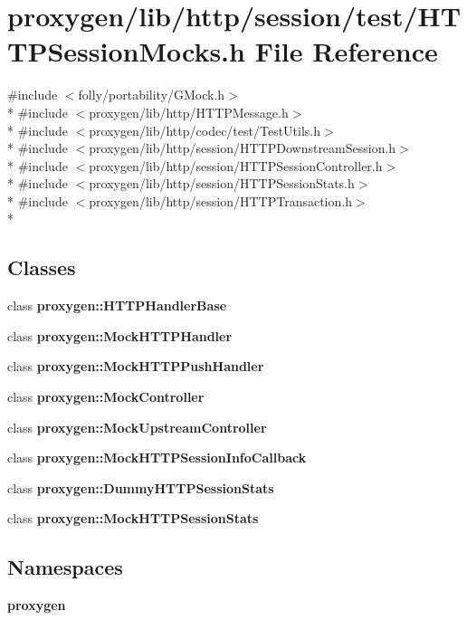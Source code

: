 \section{proxygen/lib/http/session/test/\+H\+T\+T\+P\+Session\+Mocks.h File Reference}
\label{HTTPSessionMocks_8h}
{\ttfamily \#include $<$folly/portability/\+G\+Mock.\+h$>$}\\*
{\ttfamily \#include $<$proxygen/lib/http/\+H\+T\+T\+P\+Message.\+h$>$}\\*
{\ttfamily \#include $<$proxygen/lib/http/codec/test/\+Test\+Utils.\+h$>$}\\*
{\ttfamily \#include $<$proxygen/lib/http/session/\+H\+T\+T\+P\+Downstream\+Session.\+h$>$}\\*
{\ttfamily \#include $<$proxygen/lib/http/session/\+H\+T\+T\+P\+Session\+Controller.\+h$>$}\\*
{\ttfamily \#include $<$proxygen/lib/http/session/\+H\+T\+T\+P\+Session\+Stats.\+h$>$}\\*
{\ttfamily \#include $<$proxygen/lib/http/session/\+H\+T\+T\+P\+Transaction.\+h$>$}\\*
\subsection*{Classes}
\begin{DoxyCompactItemize}
\item 
class {\bf proxygen\+::\+H\+T\+T\+P\+Handler\+Base}
\item 
class {\bf proxygen\+::\+Mock\+H\+T\+T\+P\+Handler}
\item 
class {\bf proxygen\+::\+Mock\+H\+T\+T\+P\+Push\+Handler}
\item 
class {\bf proxygen\+::\+Mock\+Controller}
\item 
class {\bf proxygen\+::\+Mock\+Upstream\+Controller}
\item 
class {\bf proxygen\+::\+Mock\+H\+T\+T\+P\+Session\+Info\+Callback}
\item 
class {\bf proxygen\+::\+Dummy\+H\+T\+T\+P\+Session\+Stats}
\item 
class {\bf proxygen\+::\+Mock\+H\+T\+T\+P\+Session\+Stats}
\end{DoxyCompactItemize}
\subsection*{Namespaces}
\begin{DoxyCompactItemize}
\item 
 {\bf proxygen}
\end{DoxyCompactItemize}
